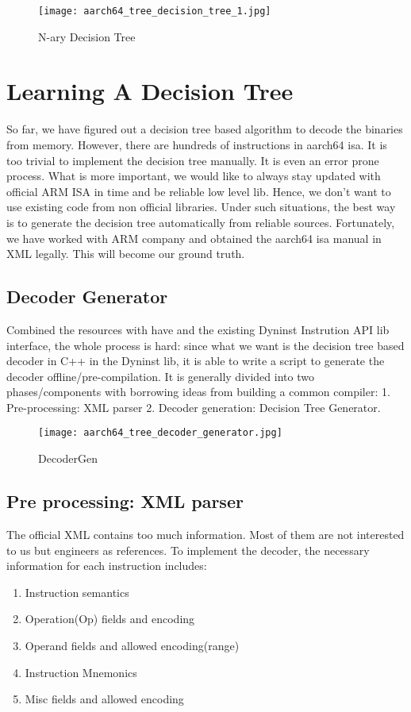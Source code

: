 \documentclass[]{article}
\begin{document}
\begin{figure}[h]
	\texttt{[image: aarch64\_tree\_decision\_tree\_1.jpg]}
	\caption{N-ary Decision Tree}
	\label{fig:ndecisiontree}
\end{figure}

\section{Learning A Decision Tree}
So far, we have figured out a decision tree based algorithm to decode the binaries from memory. However, there are hundreds of instructions in aarch64 isa. It is too trivial to implement the decision tree manually. It is even an error prone process. What is 
more important, we would like to always stay updated with official ARM ISA in time and be reliable low level lib. Hence, we don't want to use existing code from non official libraries. Under such situations, the best way is to generate the decision tree automatically from reliable sources. Fortunately, we have worked with ARM company and obtained the aarch64 isa manual in XML legally. This will 
become our ground truth.

\subsection{Decoder Generator}
Combined the resources with have and the existing Dyninst Instrution API lib interface, the whole process is hard: since what we want is the decision tree based decoder in C++ in the Dyninst lib, it is able to write a script to generate the decoder offline/pre-compilation.
It is generally divided into two phases/components with borrowing ideas from building a common compiler\cite{WEBSITE:BuildACompiler}: 1. Pre-processing: XML parser 2. Decoder generation: Decision Tree Generator.

\begin{figure}[h]
	\texttt{[image: aarch64\_tree\_decoder\_generator.jpg]}
	\caption{DecoderGen}
	\label{fig:decodergen}
\end{figure}

\subsection{Pre processing: XML parser}
The official XML contains too much information. Most of them are not interested to us but engineers as references. To implement the decoder, the necessary information for each instruction includes:
\begin{enumerate}
	\item Instruction semantics
	\item Operation(Op) fields and encoding
	\item Operand fields and allowed encoding(range)
	\item Instruction Mnemonics
	\item Misc fields and allowed encoding
\end{enumerate}
\end{document}
